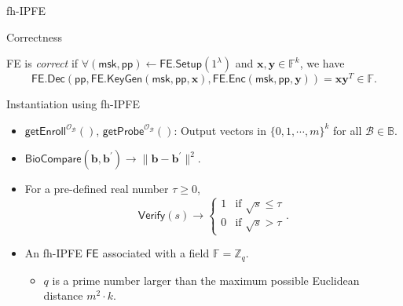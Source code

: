 \begin{frame}{fh-IPFE}

\begin{block}{Correctness}

	\textsf{FE} is \emph{correct} if $\forall (\textsf{msk}, \textsf{pp}) \gets \textsf{FE.Setup}(1^\lambda)$ and $ \mathbf{x}, \mathbf{y} \in \mathbb{F}^k$, we have
	\[
		\textsf{FE.Dec}( \textsf{pp}, \textsf{FE.KeyGen}(\textsf{msk}, \textsf{pp}, \mathbf{x}), \textsf{FE.Enc}(\textsf{msk}, \textsf{pp}, \mathbf{y}) ) = \mathbf{x} \mathbf{y}^T \in \mathbb{F}.
	\]

\end{block}

\end{frame}



\begin{frame}{Instantiation using fh-IPFE \cite{cryptoeprint:2023/481}}

\begin{itemize}
	\item<1-> $\textsf{getEnroll}^{\mathcal{O}_{\mathcal{B}}}()$, $\textsf{getProbe}^{\mathcal{O}_{\mathcal{B}}}()$: Output vectors in $ \{0, 1, \cdots, m \}^k$ for all $\mathcal{B} \in \mathbb{B}$.

	\item<2-> $\textsf{BioCompare}(\mathbf{b}, \mathbf{b}^\prime) \to \| \mathbf{b} - \mathbf{b}^\prime\|^2$.

	\item<3-> For a pre-defined real number $\tau \geq 0$,
	\[
		\textsf{Verify}(s) \to 
		\begin{cases} 
			1 & \text{if } \sqrt{s} \leq \tau \\
			0 & \text{if } \sqrt{s} > \tau 
		\end{cases}.
	\]

	\item<4-> An fh-IPFE $\textsf{FE}$ associated with a field $\mathbb{F} = \mathbb{Z}_q$.
	\begin{itemize}
		\item $q$ is a prime number larger than the maximum possible Euclidean distance $m^2 \cdot k$.
	\end{itemize}
\end{itemize}

\end{frame}


